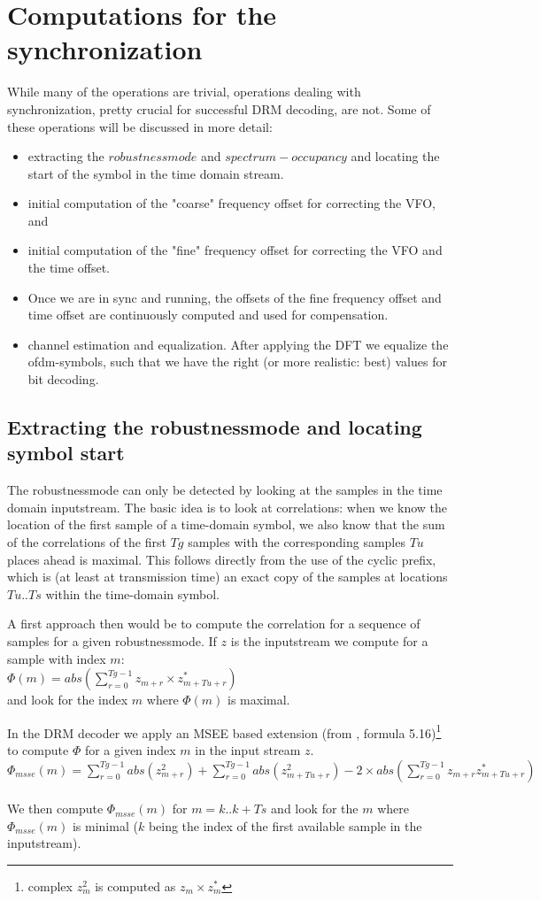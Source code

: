 \documentclass[11pt]{article}
\begin{document}
\section{Computations for the synchronization}
While many of the operations are trivial, 
operations dealing with synchronization,
pretty crucial for successful DRM decoding, are not.
Some of these operations will be discussed in more detail:
\begin{itemize}
\item extracting the $robustnessmode$ and $spectrum-occupancy$
and locating the start
of the symbol in the time domain stream.
\item initial computation of the "coarse" frequency offset for correcting
the VFO, and
\item initial computation of the "fine" frequency offset for correcting
the VFO and the time offset.
\item Once we are in sync and running, the offsets of the fine
frequency offset and time
offset are continuously computed and used for compensation.
\item channel estimation and equalization.
After applying the DFT we equalize the ofdm-symbols, such that we
have the right (or more realistic: best) values for bit decoding.
\end{itemize}
\subsection{Extracting the robustnessmode and locating symbol start}
The robustnessmode can only be detected by looking at the
samples in the time domain inputstream.
The basic idea is to look at correlations:
when we know the location of the first sample of a time-domain symbol,
we also know that the
sum of the correlations of the first $Tg$ samples with the
corresponding samples $Tu$ places ahead is maximal.
This follows directly from the use of the
cyclic prefix, which is (at least at transmission time) an exact copy
of the samples at locations $Tu .. Ts$ within the time-domain symbol.

A first approach then would be to compute the correlation
for a sequence of samples
for a given robustnessmode. If $z$ is the inputstream we compute for
a sample with index $m$:
{
\ \\
$\Phi (m) = abs (\sum_{r=0}^{Tg-1} z_{m + r} \times z_{m + Tu + r}^*)$
\ \\
}
and look for the index $m$ where $\Phi (m)$ is maximal.

In the DRM decoder we apply an MSEE based extension
(from \cite{Tsai}, formula 5.16)\footnote{complex $z_m^2$ is computed as $z_m \times z_m^*$} to compute $\Phi$ for a given index $m$ in the input stream $z$.
{
\ \\
$\Phi_{msse}(m) = \sum_{r=0}^{Tg-1} abs (z_{m+r}^2) + \sum_{r=0}^{Tg-1} abs (z_{m+ Tu + r}^2) - 2 \times abs (\sum_{r=0}^{Tg-1} z_{m+r} z_{m+Tu+r}^*)$
\ \\
}
We then compute 
$\Phi_{msse} (m)$ for $m = k .. k + Ts$ and look for
the $m$ where $\Phi_{msse}(m)$ is minimal ($k$ being the
index of the first available
sample in the inputstream).
\end{document}

